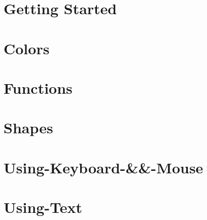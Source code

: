 \documentclass[twoside]{book}
\newcommand{\+}{\discretionary{\mbox{\scriptsize$\hookleftarrow$}}{}{}}
\begin{document}
\chapter{Getting Started}
\label{md__home_pretzel_workspace_tsgl__t_s_g_l_docs-wiki_tutorials__getting-_started}
\hypertarget{md__home_pretzel_workspace_tsgl__t_s_g_l_docs-wiki_tutorials__getting-_started}{}

\chapter{Colors}
\label{md__home_pretzel_workspace_tsgl__t_s_g_l_docs-wiki_tutorials__using-_colors}
\hypertarget{md__home_pretzel_workspace_tsgl__t_s_g_l_docs-wiki_tutorials__using-_colors}{}

\chapter{Functions}
\label{md__home_pretzel_workspace_tsgl__t_s_g_l_docs-wiki_tutorials__using-_functions}
\hypertarget{md__home_pretzel_workspace_tsgl__t_s_g_l_docs-wiki_tutorials__using-_functions}{}

\chapter{Shapes}
\label{md__home_pretzel_workspace_tsgl__t_s_g_l_docs-wiki_tutorials__using-_shapes}
\hypertarget{md__home_pretzel_workspace_tsgl__t_s_g_l_docs-wiki_tutorials__using-_shapes}{}

\chapter{Using-\/\+Keyboard-\/\&\&-\/\+Mouse}
\label{md__home_pretzel_workspace_tsgl__t_s_g_l_docs-wiki__using-_keyboard-_6_6-_mouse}
\hypertarget{md__home_pretzel_workspace_tsgl__t_s_g_l_docs-wiki__using-_keyboard-_6_6-_mouse}{}

\chapter{Using-\/\+Text}
\label{md__home_pretzel_workspace_tsgl__t_s_g_l_docs-wiki__using-_text}
\hypertarget{md__home_pretzel_workspace_tsgl__t_s_g_l_docs-wiki__using-_text}{}

\end{document}
